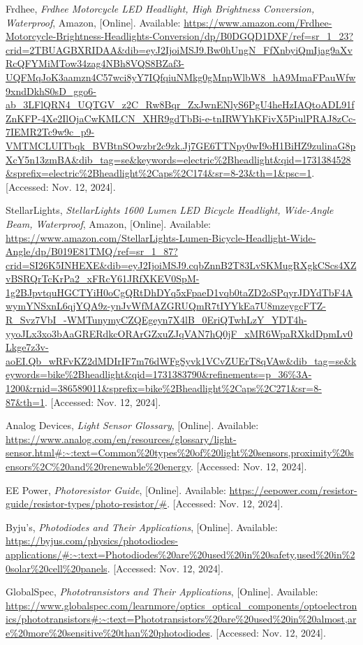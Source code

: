 \begin{thebibliography}{45}
	Frdhee, \textit{Frdhee Motorcycle LED Headlight, High Brightness Conversion, Waterproof}, Amazon, [Online]. Available: \url{https://www.amazon.com/Frdhee-Motorcycle-Brightness-Headlights-Conversion/dp/B0DGQD1DXF/ref=sr_1_23?crid=2TBUAGBXRIDAA&dib=eyJ2IjoiMSJ9.Bw0hUngN_FfXnbyiQmIjag9aXvRcQFYMiMTow34zag4NBh8VQS8BZaf3-UQFMqJoK3aamzn4C57wci8yY7IQfqiuNMkg0gMnpWlbW8_hA9MmaFPauWfw9xndDkhS0sD_ggo6-ab_3LFlQRN4_UQTGV_z2C_Rw8Bqr_ZxJwnENlyS6PgU4heHzIAQtoADL91fZnKFP-4Xe2IlOjaCwKMLCN_XHR9gdTbBi-e-tnIRWYhKFivX5PiulPRAJ8zCc-7IEMR2Tc9w9c_p9-VMTMCLUITbqk_BVBtnSOwzbr2c9zk.Jj7GE6TTNpy0wI9oH1BiHZ9zulinaG8pXcY5n13zmBA&dib_tag=se&keywords=electric%2Bheadlight&qid=1731384528&sprefix=electric%2Bheadlight%2Caps%2C174&sr=8-23&th=1&psc=1}. [Accessed: Nov. 12, 2024].
	
	StellarLights, \textit{StellarLights 1600 Lumen LED Bicycle Headlight, Wide-Angle Beam, Waterproof}, Amazon, [Online]. Available: \url{https://www.amazon.com/StellarLights-Lumen-Bicycle-Headlight-Wide-Angle/dp/B019E81TMQ/ref=sr_1_87?crid=SI26K5INHEXE&dib=eyJ2IjoiMSJ9.cqbZnnB2T83LvSKMugRXgkCScs4XZvBSRQrTcKrPa2_xFRcY61JRfXKEV0SpM-1g2BJpvtquHGCTYiH0oCgQRtDhDYq5xFpaeD1vqb0taZD2oSPqyrJDYdTbF4AwymYNSxnL6qjYQA9z-ynJvWfMAZGRUQmR7tIYYkEa7U8mzeygcFTZ-R_Svz7VbI_-WMTunymyCZQEgeyn7X4lB_0EriQTwhLzY_YDT4h-yyoJLx3xo3bAaGRERdkcORArGZxuZJqVAN7hQ0jF_xMR6WpaRXkdDpmLv0Lkge7z3v-aoEI.Qb_wRFvKZ2dMDIrIF7m76dWFgSyvk1VCvZUErT8qVAw&dib_tag=se&keywords=bike%2Bheadlight&qid=1731383790&refinements=p_36%3A-1200&rnid=386589011&sprefix=bike%2Bheadlight%2Caps%2C271&sr=8-87&th=1}. [Accessed: Nov. 12, 2024].
	
	Analog Devices, \textit{Light Sensor Glossary}, [Online]. Available: \url{https://www.analog.com/en/resources/glossary/light-sensor.html#:~:text=Common%20types%20of%20light%20sensors,proximity%20sensors%2C%20and%20renewable%20energy}. [Accessed: Nov. 12, 2024].
	
	EE Power, \textit{Photoresistor Guide}, [Online]. Available: \url{https://eepower.com/resistor-guide/resistor-types/photo-resistor/#}. [Accessed: Nov. 12, 2024].
	
	Byju's, \textit{Photodiodes and Their Applications}, [Online]. Available: \url{https://byjus.com/physics/photodiodes-applications/#:~:text=Photodiodes%20are%20used%20in%20safety,used%20in%20solar%20cell%20panels}. [Accessed: Nov. 12, 2024].
	
	GlobalSpec, \textit{Phototransistors and Their Applications}, [Online]. Available: \url{https://www.globalspec.com/learnmore/optics_optical_components/optoelectronics/phototransistors#:~:text=Phototransistors%20are%20used%20in%20almost,are%20more%20sensitive%20than%20photodiodes}. [Accessed: Nov. 12, 2024].
	

\end{thebibliography}
